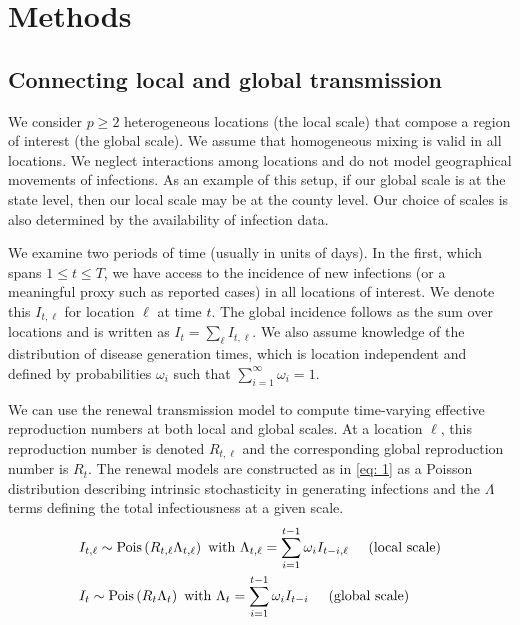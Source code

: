 \documentclass[12pt]{article}
\begin{document}
\eitem

\section*{Methods}
\subsection*{Connecting local and global transmission}\label{sec:bayes}

We consider $p\geq 2$ heterogeneous locations (the local scale) that compose a
region of interest (the global scale). We assume that homogeneous mixing is
valid in all locations. We neglect interactions among locations and do not model
geographical movements of infections. As an example of this setup, if our global
scale is at the state level, then our local scale may be at the county level.
Our choice of scales is also determined by the availability of infection data.

We examine two periods of time (usually in units of days). In the first, which
spans $1\leq t \leq T$, we have access to the incidence of new infections (or a
meaningful proxy such as reported cases) in all locations of interest. We denote
this $I_{t, \ell}$ for location $\ell$ at time $t$. The global incidence follows
as the sum over locations and is written as $I_t = \sum_{\ell} I_{t, \ell}$. We
also assume knowledge of the distribution of disease generation times, which is
location independent and defined by probabilities $\omega_i$ such that
$\sum_{i=1}^{\infty}\omega_{i} = 1$.

We can use the renewal transmission model to compute time-varying effective
reproduction numbers at both local and global scales. At a location $\ell$, this
reproduction number is denoted $R_{t, \ell}$ and the corresponding global
reproduction number is $R_{t}$. The renewal models are constructed as in
\eqref{eq: 1} as a Poisson distribution describing intrinsic
stochasticity in generating infections and the $\Lambda$ terms defining the
total infectiousness at a given scale.
\begin{equation}\label{eq: 1}
\begin{aligned}
& I_{t, \ell} \sim \text{Pois} 
\left(R_{t, \ell}\Lambda_{t, \ell}\right) \text{ with } \Lambda_{t, \ell} = \sum_{i=1}^{t-1}
\omega_{i}I_{t-i, \ell} \hspace{0.5cm}\text{(local scale)} \\
& I_t \sim \text{Pois} 
\left(R_t\Lambda_t\right) \text{ with } \Lambda_t = \sum_{i=1}^{t-1}
\omega_{i}I_{t-i} \hspace{0.5cm}\text{(global scale)}
\end{aligned}
\end{equation}
\end{document}
